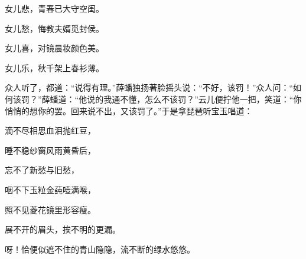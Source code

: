 \begin{poem}

    \begin{pl} 女儿悲，青春已大守空闺。 \end{pl}

    \begin{pl} 女儿愁，悔教夫婿觅封侯。 \end{pl}

    \begin{pl} 女儿喜，对镜晨妆颜色美。 \end{pl}

    \begin{pl} 女儿乐，秋千架上春衫薄。 \end{pl}
\end{poem}


\begin{parag}
    众人听了，都道：“说得有理。”薛蟠独扬著脸摇头说：“不好，该罚！”众人问：“如何该罚？”薛蟠道：“他说的我通不懂，怎么不该罚？”云儿便拧他一把，笑道：“你悄悄的想你的罢。回来说不出，又该罚了。”于是拿琵琶听宝玉唱道：
\end{parag}
\begin{poem}

    \begin{pl}

        滴不尽相思血泪抛红豆，
    \end{pl}
    \begin{pl}

        睡不稳纱窗风雨黄昏后，
    \end{pl}
    \begin{pl}

        忘不了新愁与旧愁，
    \end{pl}
    \begin{pl}

        咽不下玉粒金莼噎满喉，
    \end{pl}
    \begin{pl}

        照不见菱花镜里形容瘦。
    \end{pl}
    \begin{pl}

        展不开的眉头，挨不明的更漏。
    \end{pl}
    \begin{pl}

        呀！恰便似遮不住的青山隐隐，流不断的绿水悠悠。
    \end{pl}
\end{poem}


